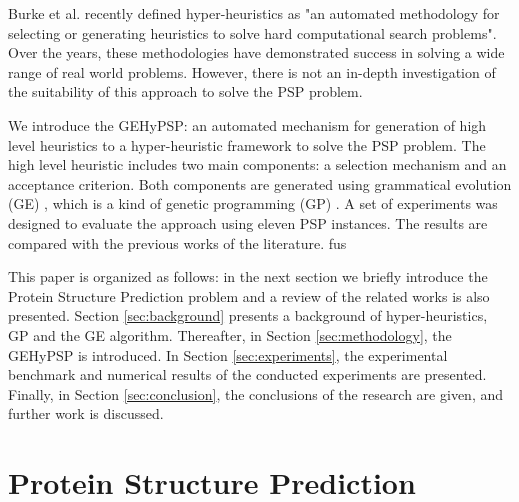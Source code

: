 \documentclass[conference]{IEEEtran}
\begin{document}
 

 Burke et al. \cite{burke2010classification} recently defined hyper-heuristics as "an automated methodology for selecting or generating heuristics to solve hard computational search problems". Over the years, these methodologies have demonstrated success in solving a wide range of real world problems.  However, there is not an in-depth investigation of the suitability of this approach to solve the PSP problem.
 
We introduce the GEHyPSP: an automated  mechanism for generation of high level heuristics to a hyper-heuristic framework to solve the PSP problem. The high level heuristic includes two main components:  a selection mechanism and an acceptance criterion. Both components are generated using grammatical evolution (GE) \cite{ryan1998grammatical}, which is a kind of genetic programming (GP) \cite{koza1992genetic}. A set of experiments was designed to evaluate the approach using eleven PSP instances. The results are compared with the previous works of the literature.  
fus


This paper is organized as follows: in the next section we briefly introduce the Protein Structure Prediction problem and a review of the related works is also presented.  Section \ref{sec:background} presents a background of hyper-heuristics, GP and the GE algorithm. Thereafter, in Section \ref{sec:methodology}, the GEHyPSP  is introduced. In Section \ref{sec:experiments}, the experimental benchmark and numerical results of the conducted experiments are presented. Finally, in Section \ref{sec:conclusion}, the conclusions of the research are given, and further work is discussed.



\section{Protein Structure Prediction} \label{sec:proteinfolding}
\end{document}
